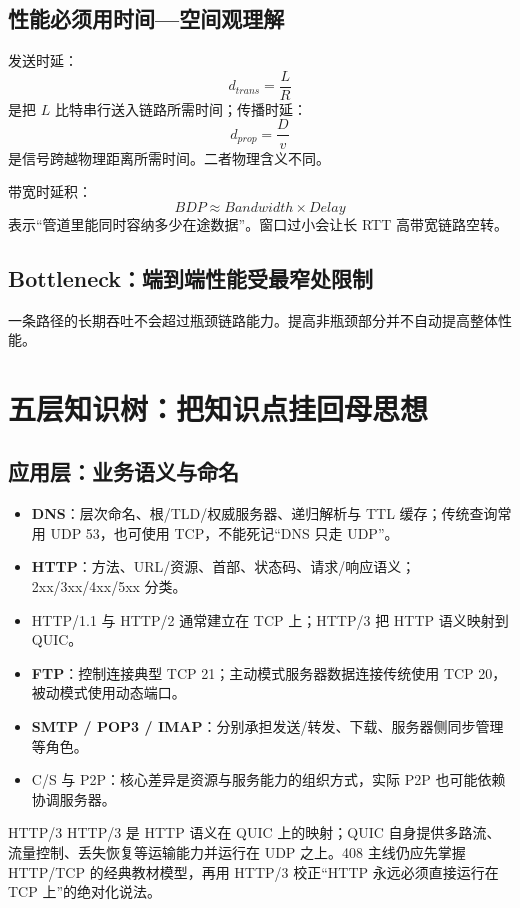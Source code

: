 \documentclass[11pt,a4paper,openany]{ctexbook}
\newcommand{\key}[1]{\textbf{\color{deep}#1}}
\begin{document}
\subsection{性能必须用时间—空间观理解}
发送时延：
\[
d_{trans}=\frac{L}{R}
\]
是把 $L$ 比特串行送入链路所需时间；传播时延：
\[
d_{prop}=\frac{D}{v}
\]
是信号跨越物理距离所需时间。二者物理含义不同。

带宽时延积：
\[
BDP\approx Bandwidth\times Delay
\]
表示“管道里能同时容纳多少在途数据”。窗口过小会让长 RTT 高带宽链路空转。

\subsection{Bottleneck：端到端性能受最窄处限制}
一条路径的长期吞吐不会超过瓶颈链路能力。提高非瓶颈部分并不自动提高整体性能。

\section{五层知识树：把知识点挂回母思想}

\subsection{应用层：业务语义与命名}
\begin{itemize}
  \item \key{DNS}：层次命名、根/TLD/权威服务器、递归解析与 TTL 缓存；传统查询常用 UDP 53，也可使用 TCP，不能死记“DNS 只走 UDP”。
  \item \key{HTTP}：方法、URL/资源、首部、状态码、请求/响应语义；2xx/3xx/4xx/5xx 分类。
  \item HTTP/1.1 与 HTTP/2 通常建立在 TCP 上；HTTP/3 把 HTTP 语义映射到 QUIC。
  \item \key{FTP}：控制连接典型 TCP 21；主动模式服务器数据连接传统使用 TCP 20，被动模式使用动态端口。
  \item \key{SMTP / POP3 / IMAP}：分别承担发送/转发、下载、服务器侧同步管理等角色。
  \item C/S 与 P2P：核心差异是资源与服务能力的组织方式，实际 P2P 也可能依赖协调服务器。
\end{itemize}

\begin{modernbox}{HTTP/3}
HTTP/3 是 HTTP 语义在 QUIC 上的映射；QUIC 自身提供多路流、流量控制、丢失恢复等运输能力并运行在 UDP 之上。408 主线仍应先掌握 HTTP/TCP 的经典教材模型，再用 HTTP/3 校正“HTTP 永远必须直接运行在 TCP 上”的绝对化说法。
\end{modernbox}
\end{document}
